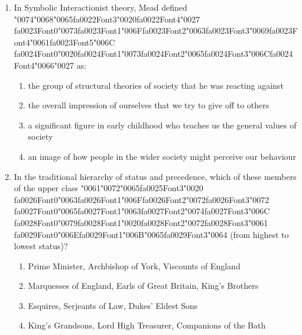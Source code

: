 \documentclass[12pt]{article}
\begin{document}
\begin{enumerate}[label=\arabic*.]
\item In Symbolic Interactionist theory, Mead defined {\char"0074}{\char"0068}{\char"0065}{\csname fa0022Font3\endcsname\char"0020}{\csname fa0022Font4\endcsname\char"0027} {\csname fa0023Font0\endcsname\char"0073}{\csname fa0023Font1\endcsname\char"006F}{\csname fa0023Font2\endcsname\char"0063}{\csname fa0023Font3\endcsname\char"0069}{\csname fa0023Font4\endcsname\char"0061}{\csname fa0023Font5\endcsname\char"006C} {\csname fa0024Font0\endcsname\char"0020}{\csname fa0024Font1\endcsname\char"0073}{\csname fa0024Font2\endcsname\char"0065}{\csname fa0024Font3\endcsname\char"006C}{\csname fa0024Font4\endcsname\char"0066}{\char"0027} as:
\begin{enumerate}[label=(\alph*)]
    \item the group of structural theories of society that he was reacting against
    \item the overall impression of ourselves that we try to give off to others
    \item a significant figure in early childhood who teaches us the general values of society
    \item an image of how people in the wider society might perceive our behaviour
\end{enumerate}
\item In the traditional hierarchy of status and precedence, which of these members of the upper class {\char"0061}{\char"0072}{\char"0065}{\csname fa0025Font3\endcsname\char"0020} {\csname fa0026Font0\endcsname\char"0063}{\csname fa0026Font1\endcsname\char"006F}{\csname fa0026Font2\endcsname\char"0072}{\csname fa0026Font3\endcsname\char"0072} {\csname fa0027Font0\endcsname\char"0065}{\csname fa0027Font1\endcsname\char"0063}{\csname fa0027Font2\endcsname\char"0074}{\csname fa0027Font3\endcsname\char"006C} {\csname fa0028Font0\endcsname\char"0079}{\csname fa0028Font1\endcsname\char"0020}{\csname fa0028Font2\endcsname\char"0072}{\csname fa0028Font3\endcsname\char"0061} {\csname fa0029Font0\endcsname\char"006E}{\csname fa0029Font1\endcsname\char"006B}{\char"0065}{\csname fa0029Font3\endcsname\char"0064} (from highest to lowest status)?
\begin{enumerate}[label=(\alph*)]
    \item Prime Minister, Archbishop of York, Viscounts of England
    \item Marquesses of England, Earls of Great Britain, King's Brothers
    \item Esquires, Serjeants of Law, Dukes' Eldest Sons
    \item King's Grandsons, Lord High Treasurer, Companions of the Bath

\end{enumerate}
\end{enumerate}
\end{document}
